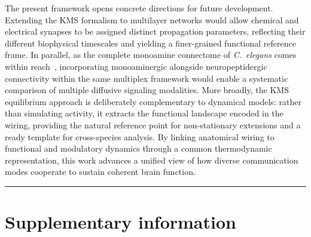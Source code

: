 \documentclass[prx,superscriptaddres, twocolumn]{revtex4-2}
\begin{document}
The present framework opens concrete directions for future development. Extending the KMS
formalism to multilayer networks would allow chemical and electrical synapses to be
assigned distinct propagation parameters, reflecting their different biophysical timescales
and yielding a finer-grained functional reference frame. In parallel, as the complete
monoamine connectome of \emph{C.~elegans} comes within
reach~\cite{bentley2016multilayer,flavell2013serotonin}, incorporating monoaminergic
alongside neuropeptidergic connectivity within the same multiplex framework would enable a
systematic comparison of multiple diffusive signaling modalities. More broadly, the KMS
equilibrium approach is deliberately complementary to dynamical models: rather than
simulating activity, it extracts the functional landscape encoded in the wiring, providing
the natural reference point for non-stationary extensions and a ready template for
cross-species analysis. By linking anatomical wiring to functional and modulatory dynamics
through a common thermodynamic representation, this work advances a unified view of how
diverse communication modes cooperate to sustain coherent brain function.


% 



 

\noindent\rule{\linewidth}{0.4pt}
\section*{Supplementary information}

\end{document}
